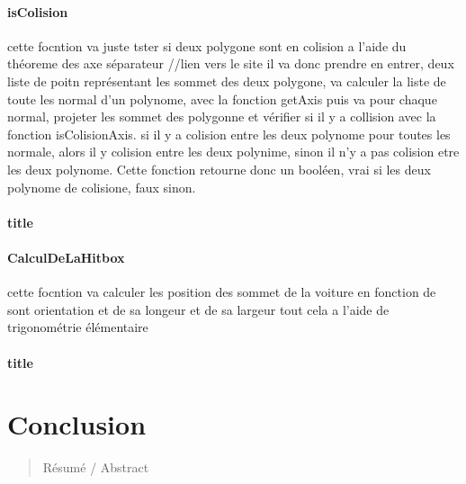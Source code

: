 \documentclass[11pt]{report}
\begin{document}
\subsubsection{isColision}


cette focntion va juste tster si deux polygone sont en colision a l'aide du théoreme des axe séparateur //lien vers le site il va donc prendre en entrer, deux liste de poitn représentant les sommet des deux polygone, va calculer la liste de toute les normal d'un polynome, avec la fonction getAxis puis va pour chaque normal, projeter les sommet des polygonne et vérifier si il y a collision avec la fonction isColisionAxis. si il y a colision entre les deux polynome pour toutes les normale, alors il y colision entre les deux polynime, sinon il n'y a pas colision etre les deux polynome.
Cette fonction retourne donc un booléen, vrai si les deux polynome de colisione, faux sinon.


\subsubsection{title}



\subsubsection{CalculDeLaHitbox}



cette focntion va calculer les position des sommet de la voiture en fonction de sont orientation et de sa longeur et de sa largeur tout cela a l'aide de trigonométrie élémentaire

\subsubsection{title}




\chapter*{Conclusion}


\begin{abstract}
Résumé / Abstract
\end{abstract}
\end{document}
